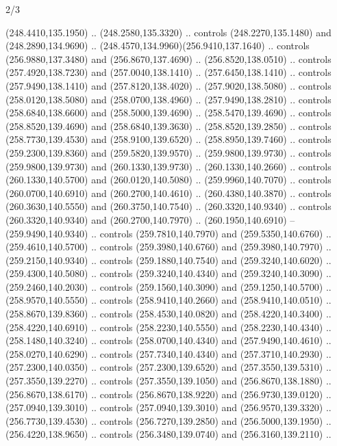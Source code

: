 \begin{flagdescription}{2/3}
\begin{scope}[xshift=0.5\flaglength,yshift=0.5\flagwidth,scale=\flagwidth/259.2]
\begin{scope}[y=0.8pt, x=0.8pt, yscale=-1,shift={(-243,-162)}]
      (248.4410,135.1950) .. (248.2580,135.3320) .. controls (248.2270,135.1480) and
      (248.2890,134.9690) .. (248.4570,134.9960)(256.9410,137.1640) .. controls
      (256.9880,137.3480) and (256.8670,137.4690) .. (256.8520,138.0510) .. controls
      (257.4920,138.7230) and (257.0040,138.1410) .. (257.6450,138.1410) .. controls
      (257.9490,138.1410) and (257.8120,138.4020) .. (257.9020,138.5080) .. controls
      (258.0120,138.5080) and (258.0700,138.4960) .. (257.9490,138.2810) .. controls
      (258.6840,138.6600) and (258.5000,139.4690) .. (258.5470,139.4690) .. controls
      (258.8520,139.4690) and (258.6840,139.3630) .. (258.8520,139.2850) .. controls
      (258.7730,139.4530) and (258.9100,139.6520) .. (258.8950,139.7460) .. controls
      (259.2300,139.8360) and (259.5820,139.9570) .. (259.9800,139.9730) .. controls
      (259.9800,139.9730) and (260.1330,139.9730) .. (260.1330,140.2660) .. controls
      (260.1330,140.5700) and (260.0120,140.5080) .. (259.9960,140.7070) .. controls
      (260.0700,140.6910) and (260.2700,140.4610) .. (260.4380,140.3870) .. controls
      (260.3630,140.5550) and (260.3750,140.7540) .. (260.3320,140.9340) .. controls
      (260.3320,140.9340) and (260.2700,140.7970) .. (260.1950,140.6910) --
      (259.9490,140.9340) .. controls (259.7810,140.7970) and (259.5350,140.6760) ..
      (259.4610,140.5700) .. controls (259.3980,140.6760) and (259.3980,140.7970) ..
      (259.2150,140.9340) .. controls (259.1880,140.7540) and (259.3240,140.6020) ..
      (259.4300,140.5080) .. controls (259.3240,140.4340) and (259.3240,140.3090) ..
      (259.2460,140.2030) .. controls (259.1560,140.3090) and (259.1250,140.5700) ..
      (258.9570,140.5550) .. controls (258.9410,140.2660) and (258.9410,140.0510) ..
      (258.8670,139.8360) .. controls (258.4530,140.0820) and (258.4220,140.3400) ..
      (258.4220,140.6910) .. controls (258.2230,140.5550) and (258.2230,140.4340) ..
      (258.1480,140.3240) .. controls (258.0700,140.4340) and (257.9490,140.4610) ..
      (258.0270,140.6290) .. controls (257.7340,140.4340) and (257.3710,140.2930) ..
      (257.2300,140.0350) .. controls (257.2300,139.6520) and (257.3550,139.5310) ..
      (257.3550,139.2270) .. controls (257.3550,139.1050) and (256.8670,138.1880) ..
      (256.8670,138.6170) .. controls (256.8670,138.9220) and (256.9730,139.0120) ..
      (257.0940,139.3010) .. controls (257.0940,139.3010) and (256.9570,139.3320) ..
      (256.7730,139.4530) .. controls (256.7270,139.2850) and (256.5000,139.1950) ..
      (256.4220,138.9650) .. controls (256.3480,139.0740) and (256.3160,139.2110) ..

\end{scope}
\end{scope}
\end{flagdescription}

